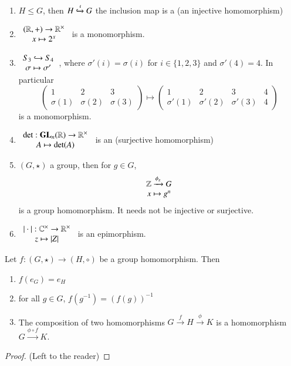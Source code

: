 \begin{example}
    \leavevmode
    \begin{enumerate}
        \item $H \leq G$, then $H \xhookrightarrow{\iota} G$ the inclusion map is a  (an injective homomorphism)
        \item $\begin{array}{c} (\mathbb R,+)\rightarrow \mathbb R^{\times} \\ x\mapsto 2^x \end{array}$ is a monomorphism.
        \item $\begin{array}{c} S_3 \hookrightarrow S_4 \\ \sigma \mapsto \sigma' \end{array}$, where $\sigma'(i) = \sigma(i)$ for $i \in \{1,2,3\}$ and $\sigma'(4) = 4$. In particular $$\begin{pmatrix} 1 & 2 & 3 \\ \sigma(1) & \sigma(2) & \sigma(3)  \end{pmatrix}\mapsto \begin{pmatrix} 1 & 2 & 3 & 4 \\ \sigma'(1) & \sigma'(2) & \sigma'(3) & 4  \end{pmatrix}$$
        is a monomorphism.
        \item $\begin{array}{c} \det:\mathbf{GL}_n(\mathbb R) \rightarrow \mathbb R^{\times} \\ A \mapsto \det(A) \end{array}$ is an  (surjective homomorphism)
        \item $(G,\star)$ a group, then for $g \in G$, $$\begin{array}{c} \mathbb Z\xrightarrow{\phi_g}G \\ x\mapsto g^n \end{array}$$ is a group homomorphism. It needs not be injective or surjective.
        \item $\begin{array}{c} |\cdot|:\mathbb C^{\times}\rightarrow \mathbb R^{\times} \\ z\mapsto |Z| \end{array}$ is an epimorphism.
    \end{enumerate}
\end{example}


\begin{props}
    Let $f:(G,\star)\rightarrow (H,\circ)$ be a group homomorphism. Then \begin{enumerate}
        \item $f(e_G) = e_H$
        \item for all $g \in G$, $f(g^{-1}) = (f(g))^{-1}$
        \item The composition of two homomorphisms $G \xrightarrow{f} H \xrightarrow{\phi}K$ is a homomorphism $G\xrightarrow{\phi \circ f}K$.
    \end{enumerate}
\end{props}
\begin{proof}
    (Left to the reader)
\end{proof}

